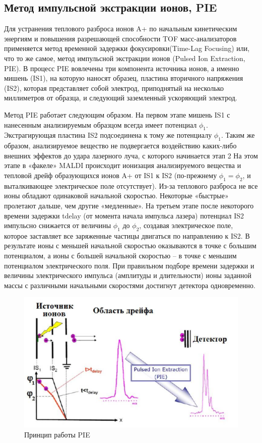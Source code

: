 \documentclass{article}
\begin{document}
\subsection{Метод импульсной экстракции ионов, PIE}\;
\par Для устранения теплового разброса ионов A+ по начальным
кинетическим энергиям и повышения разрешающей способности TOF масс-анализаторов применяется метод временной задержки фокусировки(Time-Lag Focusing) или, что то же самое, метод импульсной экстракции
ионов (Pulsed Ion Extraction, PIE). В процесс PIE вовлечены три компонента источника ионов, а именно мишень (IS1), на которую наносят образец, пластина вторичного напряжения (IS2), которая представляет собой электрод, приподнятый на несколько миллиметров от образца, и следующий заземленный ускоряющий электрод. 

Метод PIE работает следующим образом. На первом этапе мишень IS1
с нанесенным анализируемым образцом всегда имеет потенциал $\phi_1$. Экстрагирующая пластина IS2 подсоединена к тому же потенциалу $\phi_1$. Таким же образом, анализируемое вещество не подвергается воздействию каких-либо внешних эффектов до удара лазерного луча, с которого начинается этап 2 На этом этапе в «факеле» MALDI происходит ионизация анализируемого вещества и тепловой дрейф образующихся ионов A+ от IS1 к IS2
(по-прежнему $\phi_1 = \phi_2$, и выталкивающее электрическое поле отсутствует). Из-за теплового разброса не все ионы обладают одинаковой начальной скоростью. Некоторые «быстрые» пролетают дальше, чем другие «медленные». На третьем этапе после некоторого времени задержки tdelay (от момента начала импульса лазера) потенциал IS2 импульсно снижается от величины $\phi_1$ до $\phi_2$, создавая электрическое поле, которое заставляет все заряженные частицы двигаться по направлению к IS2.
В результате ионы с меньшей начальной скоростью оказываются в
точке с большим потенциалом, а ионы с большей начальной скоростью – в точке с меньшим потенциалом электрического поля. При правильном подборе времени задержки и величины электрического импульса (амплитуды и длительности) ионы заданной массы с различными начальными скоростями достигнут детектора одновременно. 

\begin{figure}[h!]
        \centering
        \includegraphics[scale=0.4]{Images/2025-01-18_23-43-26.png}
        \caption{Принцип работы PIE}
\end{figure}
\newpage
\end{document}
